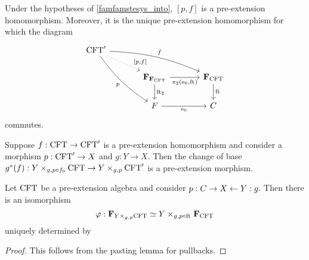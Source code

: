 \begin{lem}
Under the hypotheses of \autoref{famfamstesys_into}, $[p,f]$ is a pre-extension
homomorphism. Moreover, it is the unique pre-extension homomorphism for which
the diagram
\begin{equation*}
\begin{tikzcd}[column sep=large]
\stesys' 
  \ar[bend left=10]{rrd}{f}
  \ar[swap,bend right=10]{ddr}{p}
  \ar[dotted]{dr}[near end]{[p,f]}
  \\
  {}&
\famesys{\famesys{\stesys}}
  \ar{r}[swap]{\pullbackpr{2}{\ectxext}{\eft}}
  \ar{d}{\eft[2]}
  &
\famesys{\stesys}
  \ar{d}{\eft}
  \\
  {}&
\stesysf
  \ar{r}[swap]{\ectxext}
  &
\stesysc
\end{tikzcd}
\end{equation*}
commutes.
\end{lem}

\begin{lem}
Suppose $f:\mathrm{CFT}\to \mathrm{CFT}'$ is a pre-extension homomorphism and consider a morphism
$p:\mathrm{CFT}'\to X$ and $g:Y\to X$. Then the change of base 
$g^\ast(f):\cobesys{Y}{\stesys}{g}{p\circ f_0}\to
\cobesys{Y}{\stesys'}{g}{p}$ is a pre-extension morphism.
\end{lem}

\begin{lem}
Let $\mathrm{CFT}$ be a pre-extension algebra and consider $p:C\rightarrow X\leftarrow Y:g$.
Then there is an isomorphism
\begin{equation*}
\varphi:\famesys{\cobesys{Y}{\stesys}{g}{p}}
  \simeq
\cobesys{Y}{\famesys{\stesys}}{g}{p\circ\eft}
\end{equation*}
uniquely determined by
\end{lem}

\begin{proof}
This follows from the pasting lemma for pullbacks.
\end{proof}
